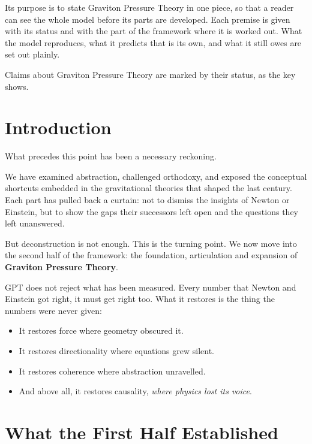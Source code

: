 \documentclass[11pt,a4paper]{article}
\begin{document}
Its purpose is to state Graviton Pressure Theory in one piece, so that a reader can see the whole model before its parts are developed. Each premise is given with its status and with the part of the framework where it is worked out. What the model reproduces, what it predicts that is its own, and what it still owes are set out plainly.

Claims about Graviton Pressure Theory are marked by their status, as the key shows.

\statuskey

\section*{Introduction}

What precedes this point has been a necessary reckoning.

We have examined abstraction, challenged orthodoxy, and exposed the conceptual shortcuts embedded in the gravitational theories that shaped the last century. Each part has pulled back a curtain: not to dismiss the insights of Newton or Einstein, but to show the gaps their successors left open and the questions they left unanswered.

But deconstruction is not enough. This is the turning point. We now move into the second half of the framework: the foundation, articulation and expansion of \textbf{Graviton Pressure Theory}.

GPT does not reject what has been measured. Every number that Newton and Einstein got right, it must get right too. What it restores is the thing the numbers were never given:
\begin{itemize}
\item It restores force where geometry obscured it.
\item It restores directionality where equations grew silent.
\item It restores coherence where abstraction unravelled.
\item And above all, it restores causality, \textit{where physics lost its voice}.
\end{itemize}

\section{What the First Half Established}
\label{sec:first}
\end{document}

